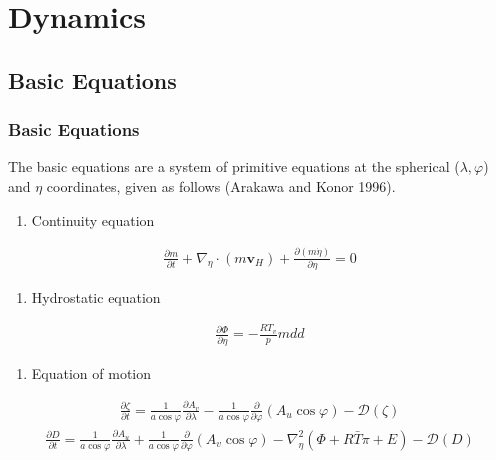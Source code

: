 \hypertarget{dynamics}{%
\section{Dynamics}\label{dynamics}}

\hypertarget{basic-equations}{%
\subsection{Basic Equations}\label{basic-equations}}

\hypertarget{basic-equations-1}{%
\subsubsection{Basic Equations}\label{basic-equations-1}}

The basic equations are a system of primitive equations at the spherical (\(\lambda,\varphi\)) and \(\eta\) coordinates, given as follows (Arakawa and Konor 1996).

\begin{enumerate}
\def\labelenumi{\arabic{enumi}.}
\tightlist
\item
  Continuity equation
\end{enumerate}

\begin{eqnarray}
  \frac{\partial m}{\partial t}
    + \nabla_{\eta} \cdot (m\mathbf{v}_H)+ \frac{\partial (m\dot{\eta})}{\partial \eta} = 0  \end{eqnarray}

\begin{enumerate}
\def\labelenumi{\arabic{enumi}.}
\tightlist
\item
  Hydrostatic equation
\end{enumerate}

\begin{eqnarray}
  \frac{\partial \Phi}{\partial \eta} = - \frac{RT_v}{p} mdd
\end{eqnarray}

\begin{enumerate}
\def\labelenumi{\arabic{enumi}.}
\tightlist
\item
  Equation of motion
\end{enumerate}

\begin{eqnarray}
  \frac{\partial \zeta}{\partial t}
     =   \frac{1}{a\cos\varphi}
            \frac{\partial A_v}{\partial \lambda}
          - \frac{1}{a\cos \varphi}
            \frac{\partial}{\partial \varphi} ( A_u \cos\varphi )
          - {\mathcal D}(\zeta)
\end{eqnarray} \begin{eqnarray}
  \frac{\partial D}{\partial t}
     =    \frac{1}{a\cos\varphi}
            \frac{\partial A_u}{\partial \lambda}
          + \frac{1}{a\cos\varphi}
            \frac{\partial }{\partial \varphi} ( A_v \cos\varphi )
          - \nabla^{2}_{\eta}
           ( \Phi + R \bar{T} \pi + E )
          - {\mathcal D}(D)   \end{eqnarray}

